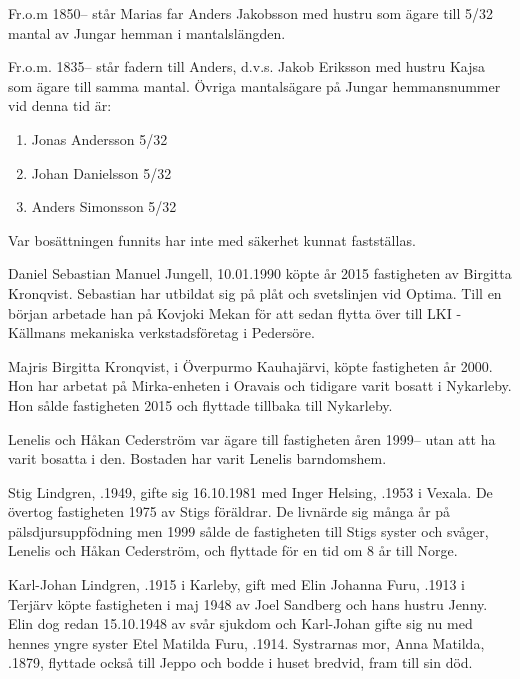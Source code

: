 Fr.o.m 1850-- står Marias far Anders Jakobsson med hustru som ägare till 5/32 mantal av Jungar hemman i mantalslängden.

Fr.o.m. 1835-- står fadern till Anders, d.v.s. Jakob Eriksson med hustru Kajsa som ägare till samma mantal. Övriga mantalsägare på Jungar hemmansnummer vid denna tid är:
\begin{enumerate}
  \item Jonas Andersson 5/32
  \item Johan Danielsson 5/32
  \item Anders Simonsson 5/32
\end{enumerate}
Var bosättningen funnits har inte med säkerhet kunnat fastställas.




Daniel Sebastian Manuel Jungell, 10.01.1990 köpte år 2015 fastigheten av Birgitta Kronqvist. Sebastian har utbildat sig på plåt och svetslinjen vid Optima. Till en början arbetade han på Kovjoki Mekan för att sedan flytta över till LKI -Källmans mekaniska verkstadsföretag i Pedersöre.


Majris Birgitta Kronqvist,  i Överpurmo Kauhajärvi, köpte fastigheten år 2000. Hon har arbetat på Mirka-enheten i Oravais och tidigare varit bosatt i Nykarleby. Hon sålde fastigheten 2015 och flyttade tillbaka till Nykarleby.


Lenelis och Håkan Cederström var ägare till fastigheten åren 1999-- utan att ha varit bosatta i den. Bostaden har varit
Lenelis barndomshem.


Stig Lindgren, .1949, gifte sig 16.10.1981 med Inger Helsing, .1953 i Vexala. De övertog fastigheten 1975 av Stigs föräldrar. De livnärde sig många år på pälsdjursuppfödning men 1999 sålde de fastigheten  till Stigs syster och svåger, Lenelis och Håkan Cederström, och flyttade för en tid om 8 år till Norge.


Karl-Johan Lindgren, .1915 i Karleby,  gift med Elin Johanna Furu, .1913 i Terjärv köpte fastigheten i maj 1948 av Joel Sandberg och hans hustru Jenny. Elin dog redan 15.10.1948 av svår sjukdom och Karl-Johan gifte sig nu med hennes yngre syster Etel Matilda Furu, .1914. Systrarnas mor, Anna Matilda, .1879, flyttade också till Jeppo och bodde i huset bredvid, fram till sin död.

